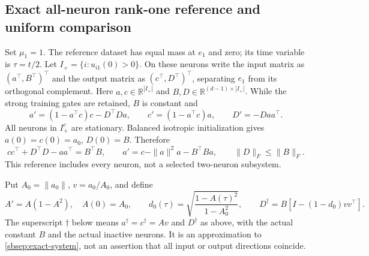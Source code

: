 \documentclass{article} %
\theoremstyle{plain}
\theoremstyle{definition}
\theoremstyle{remark}
\begin{document}
\subsection{Exact all-neuron rank-one reference and uniform comparison}

Set $\mu_1=1$. The reference dataset has equal mass at $e_1$ and zero;
its time variable is $\tau=t/2$. Let $I_+=\{i:u_{i1}(0)>0\}$.
On these neurons write the input matrix as $(a^\top,B^\top)^\top$ and
the output matrix as $(c^\top,D^\top)^\top$, separating $e_1$ from its
orthogonal complement. Here $a,c\in\mathbb R^{|I_+|}$ and
$B,D\in\mathbb R^{(d-1)\times|I_+|}$. While the strong training gates
are retained, $B$ is constant and
\begin{equation}\label{sbsep:exact-system}
 a'=(1-a^\top c)c-D^\top Da,\qquad
 c'=(1-a^\top c)a,\qquad D'=-Daa^\top.
\end{equation}
All neurons in $I_+^c$ are stationary. Balanced isotropic initialization
gives $a(0)=c(0)=a_0$, $D(0)=B$. Therefore
\begin{equation}\label{sbsep:gram}
 cc^\top+D^\top D-aa^\top=B^\top B,\qquad
 a'=c-\|a\|^2a-B^\top Ba,\qquad \|D\|_F\le\|B\|_F.
\end{equation}
This reference includes every neuron, not a selected two-neuron subsystem.

Put $A_0=\|a_0\|$, $v=a_0/A_0$, and define
\begin{equation}\label{sbsep:scalar-reference}
 A'=A(1-A^2),\quad A(0)=A_0,\qquad
 d_0(\tau)=\sqrt{\frac{1-A(\tau)^2}{1-A_0^2}},\qquad
 D^\dagger=B[I-(1-d_0)vv^\top].
\end{equation}
The superscript $\dagger$ below means $a^\dagger=c^\dagger=Av$ and
$D^\dagger$ as above, with the actual constant $B$ and the actual inactive
neurons. It is an approximation to \eqref{sbsep:exact-system}, not an
assertion that all input or output directions coincide.
\end{document}
